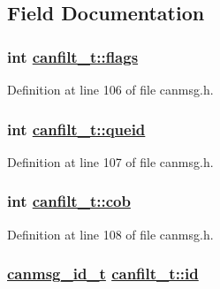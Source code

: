 \subsection{Field Documentation}
\hypertarget{structcanfilt__t_fdcc03f2a187f0b468081815c2f709c3}{
\subsubsection[flags]{\setlength{\rightskip}{0pt plus 5cm}int \hyperlink{structcanfilt__t_fdcc03f2a187f0b468081815c2f709c3}{canfilt\_\-t::flags}}}
\label{structcanfilt__t_fdcc03f2a187f0b468081815c2f709c3}




Definition at line 106 of file canmsg.h.\hypertarget{structcanfilt__t_02e22abff78f9bdfb42a957d5beb4130}{
\subsubsection[queid]{\setlength{\rightskip}{0pt plus 5cm}int \hyperlink{structcanfilt__t_02e22abff78f9bdfb42a957d5beb4130}{canfilt\_\-t::queid}}}
\label{structcanfilt__t_02e22abff78f9bdfb42a957d5beb4130}




Definition at line 107 of file canmsg.h.\hypertarget{structcanfilt__t_7d6d90e3ba8c36b857306873b1584005}{
\subsubsection[cob]{\setlength{\rightskip}{0pt plus 5cm}int \hyperlink{structcanfilt__t_7d6d90e3ba8c36b857306873b1584005}{canfilt\_\-t::cob}}}
\label{structcanfilt__t_7d6d90e3ba8c36b857306873b1584005}




Definition at line 108 of file canmsg.h.\hypertarget{structcanfilt__t_f53a58f5928e6832631bae811a93b1fb}{
\subsubsection[id]{\setlength{\rightskip}{0pt plus 5cm}\hyperlink{canmsg_8h_4df2eff676652dbe67d372e42ccf8aa7}{canmsg\_\-id\_\-t} \hyperlink{structcanfilt__t_f53a58f5928e6832631bae811a93b1fb}{canfilt\_\-t::id}}}
\label{structcanfilt__t_f53a58f5928e6832631bae811a93b1fb}




